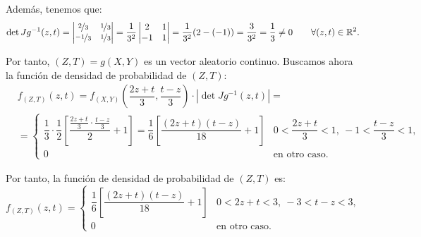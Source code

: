 \begin{ejercicio}
    Además, tenemos que:
    \begin{equation*}
        \det Jg^{-1}(z,t)=\begin{vmatrix}
            \nicefrac{2}{3} & \nicefrac{1}{3} \\
            \nicefrac{-1}{3} & \nicefrac{1}{3}
        \end{vmatrix}=\frac{1}{3^2}\begin{vmatrix}
            2 & 1 \\
            -1 & 1
        \end{vmatrix}=\frac{1}{3^2}(2-(-1))=\frac{3}{3^2}=\frac{1}{3}\neq 0 \qquad \forall (z,t)\in\mathbb{R}^2.
    \end{equation*}

    Por tanto, $(Z,T)=g(X,Y)$ es un vector aleatorio continuo. Buscamos ahora la función de densidad de probabilidad de $(Z,T)$:
    \begin{align*}
        &f_{(Z,T)}(z, t)=f_{(X,Y)}\left(\dfrac{2z+t}{3},\dfrac{t-z}{3}\right)\cdot \left|\det Jg^{-1}\left(z,t\right)\right|
        =\\&= \begin{cases}
            \dfrac{1}{3}\cdot \dfrac{1}{2}\left[\dfrac{\frac{2z+t}{3}\cdot \frac{t-z}{3}}{2}+1\right]
            =\dfrac{1}{6}\left[\dfrac{(2z+t)(t-z)}{18}+1\right] & 0<\dfrac{2z+t}{3}<1,~-1<\dfrac{t-z}{3}<1, \\
            0 & \text{en otro caso}.
        \end{cases}
    \end{align*}

    Por tanto, la función de densidad de probabilidad de $(Z,T)$ es:
    \begin{equation*}
        f_{(Z,T)}(z, t) = \begin{cases}
            \dfrac{1}{6}\left[\dfrac{(2z+t)(t-z)}{18}+1\right] & 0<2z+t<3,~-3<t-z<3, \\
            0 & \text{en otro caso}.
        \end{cases}
    \end{equation*}
\end{ejercicio}

